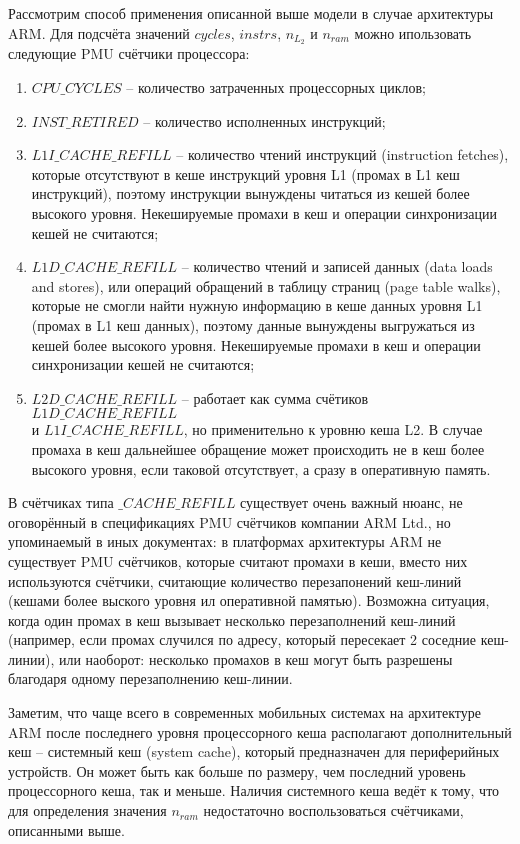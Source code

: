     Рассмотрим способ применения описанной выше модели в случае архитектуры ARM.
    Для подсчёта значений $cycles$, $instrs$, $n_{L_2}$ и $n_{ram}$ можно ипользовать
    следующие PMU счётчики процессора:
    \begin{enumerate}
        \item $CPU\_CYCLES$ -- количество затраченных процессорных циклов;
        \item $INST\_RETIRED$ -- количество исполненных инструкций;
        \item $L1I\_CACHE\_REFILL$ -- количество чтений инструкций (instruction fetches),
        которые отсутствуют в кеше инструкций уровня L1 (промах в L1 кеш инструкций),
        поэтому инструкции вынуждены читаться из кешей более высокого уровня.
        Некешируемые промахи в кеш и операции синхронизации кешей не считаются;
        \item $L1D\_CACHE\_REFILL$ -- количество чтений и записей данных (data loads and stores),
        или операций обращений в таблицу страниц (page table walks), которые не смогли
        найти нужную информацию в кеше данных уровня L1 (промах в L1 кеш данных),
        поэтому данные вынуждены выгружаться из кешей более высокого уровня.
        Некешируемые промахи в кеш и операции синхронизации кешей не считаются;
        \item $L2D\_CACHE\_REFILL$ -- работает как сумма счётиков $L1D\_CACHE\_REFILL$ \\ и
        $L1I\_CACHE\_REFILL$, но применительно к уровню кеша L2. В случае промаха в кеш дальнейшее
        обращение может происходить не в кеш более высокого уровня, если таковой отсутствует,
        а сразу в оперативную память.
    \end{enumerate}

    В счётчиках типа $\_CACHE\_REFILL$ существует очень важный нюанс, не оговорённый
    в спецификациях PMU счётчиков компании ARM Ltd.,
    но упоминаемый в иных документах: в платформах архитектуры ARM не существует PMU
    счётчиков, которые считают промахи в кеши, вместо них используются счётчики, считающие
    количество перезапонений кеш-линий (кешами более выского уровня ил оперативной памятью).
    Возможна ситуация, когда один промах в кеш вызывает
    несколько перезаполнений кеш-линий (например, если промах случился по адресу,
    который пересекает 2 соседние кеш-линии), или наоборот: несколько промахов
    в кеш могут быть разрешены благодаря одному перезаполнению кеш-линии.

    Заметим, что чаще всего в современных мобильных системах на архитектуре ARM после последнего
    уровня процессорного кеша располагают дополнительный кеш -- системный кеш (system cache),
    который предназначен для периферийных устройств. Он может быть как больше по размеру, чем
    последний уровень процессорного кеша, так и меньше. Наличия системного кеша ведёт к тому,
    что для определения значения $n_{ram}$ недостаточно воспользоваться счётчиками, описанными
    выше.

